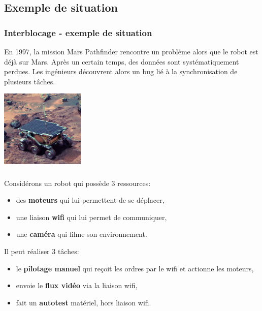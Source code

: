 \documentclass[svgnames,11pt]{beamer}
\begin{document}
\subsection{Exemple de situation}
\begin{frame}
    \frametitle{Interblocage - exemple de situation}

    En 1997, la mission Mars Pathfinder rencontre un problème alors que le robot est déjà sur Mars. Après un certain temps, des données sont systématiquement perdues. Les ingénieurs découvrent alors un bug lié à la synchronisation de plusieurs tâches.
    \begin{center}
        \centering
        \includegraphics[width=4cm]{ressources/pathfinder.jpg}
        \label{IMG}
    \end{center}

\end{frame}
\begin{frame}
    \frametitle{}

    Considérons un robot qui possède 3 ressources:
    \begin{itemize}
        \item des \textbf{moteurs} qui lui permettent de se déplacer,
        \item une liaison \textbf{wifi} qui lui permet de communiquer,
        \item une \textbf{caméra} qui filme son environnement.

    \end{itemize}
    \vspace{1.5cm}
    Il peut réaliser 3 tâches:
    \begin{itemize}
        \item le \textbf{pilotage manuel} qui reçoit les ordres par le wifi et actionne les moteurs,
        \item envoie le \textbf{flux vidéo} via la liaison wifi,
        \item fait un \textbf{autotest} matériel, hors liaison wifi.

    \end{itemize}
\end{frame}
\end{document}
